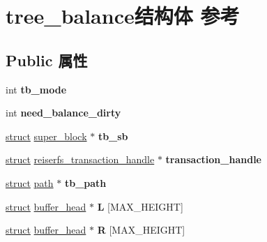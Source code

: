 \hypertarget{structtree__balance}{}\section{tree\+\_\+balance结构体 参考}
\label{structtree__balance}
\subsection*{Public 属性}
\begin{DoxyCompactItemize}
\item 
\mbox{\label{structtree__balance_a3570d24528b0cb71f0833f6c7decda2d}} 
int {\bfseries tb\+\_\+mode}
\item 
\mbox{\label{structtree__balance_a3c481edaaf3e8e8edbdfbcb25f5aa163}} 
int {\bfseries need\+\_\+balance\+\_\+dirty}
\item 
\mbox{\label{structtree__balance_a6c0ac6f6328256e28a7a4bb872da4245}} 
\hyperlink{interfacestruct}{struct} \hyperlink{structsuper__block}{super\+\_\+block} $\ast$ {\bfseries tb\+\_\+sb}
\item 
\mbox{\label{structtree__balance_a8eae60641ab72c8786a3ea9c227bdac7}} 
\hyperlink{interfacestruct}{struct} \hyperlink{structreiserfs__transaction__handle}{reiserfs\+\_\+transaction\+\_\+handle} $\ast$ {\bfseries transaction\+\_\+handle}
\item 
\mbox{\label{structtree__balance_a07e396014c9b70f0d8fbf001d4a496a8}} 
\hyperlink{interfacestruct}{struct} \hyperlink{structpath}{path} $\ast$ {\bfseries tb\+\_\+path}
\item 
\mbox{\label{structtree__balance_a9594ffd53e2e1f3ed8b011b0bc4bddfc}} 
\hyperlink{interfacestruct}{struct} \hyperlink{structbuffer__head}{buffer\+\_\+head} $\ast$ {\bfseries L} \mbox{[}M\+A\+X\+\_\+\+H\+E\+I\+G\+HT\mbox{]}
\item 
\mbox{\label{structtree__balance_ad3af08616a570dd8dff164db89b6976e}} 
\hyperlink{interfacestruct}{struct} \hyperlink{structbuffer__head}{buffer\+\_\+head} $\ast$ {\bfseries R} \mbox{[}M\+A\+X\+\_\+\+H\+E\+I\+G\+HT\mbox{]}

\end{DoxyCompactItemize}

